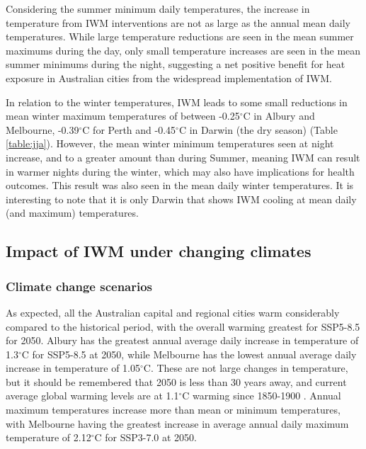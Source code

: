 \documentclass[final,3p,times,authoryear]{elsarticle}
\begin{document}
Considering the summer minimum daily temperatures, the increase in temperature from IWM interventions are not as large as the annual mean daily temperatures. While large temperature reductions are seen in the mean summer maximums during the day, only small temperature increases are seen in the mean summer minimums during the night, suggesting a net positive benefit for heat exposure in Australian cities from the widespread implementation of IWM. 

In relation to the winter temperatures, IWM leads to some small reductions in mean winter maximum temperatures of between -0.25$^{\circ}$C in Albury and Melbourne, -0.39$^{\circ}$C for Perth and -0.45$^{\circ}$C in Darwin (the dry season) (Table \ref{table:jja}). However, the mean winter minimum temperatures seen at night increase, and to a greater amount than during Summer, meaning IWM can result in warmer nights during the winter, which may also have implications for health outcomes. This result was also seen in the mean daily winter temperatures. It is interesting to note that it is only Darwin that shows IWM cooling at mean daily (and maximum) temperatures.  

\subsection{Impact of IWM under changing climates }\label{sec:results3}

\subsubsection{Climate change scenarios}\label{sec:results3a}

As expected, all the Australian capital and regional cities warm considerably compared to the historical period, with the overall warming greatest for SSP5-8.5 for 2050. Albury has the greatest annual average daily increase in temperature of 1.3$^{\circ}$C for SSP5-8.5 at 2050, while Melbourne has the lowest annual average daily increase in temperature of 1.05$^{\circ}$C. These are not large changes in temperature, but it should be remembered that 2050 is less than 30 years away, and current average global warming levels are at 1.1$^{\circ}$C warming since 1850-1900 \citep{IPCC2021}. Annual maximum temperatures increase more than mean or minimum temperatures, with Melbourne having the greatest increase in average annual daily maximum temperature of 2.12$^{\circ}$C for SSP3-7.0 at 2050.
\end{document}
